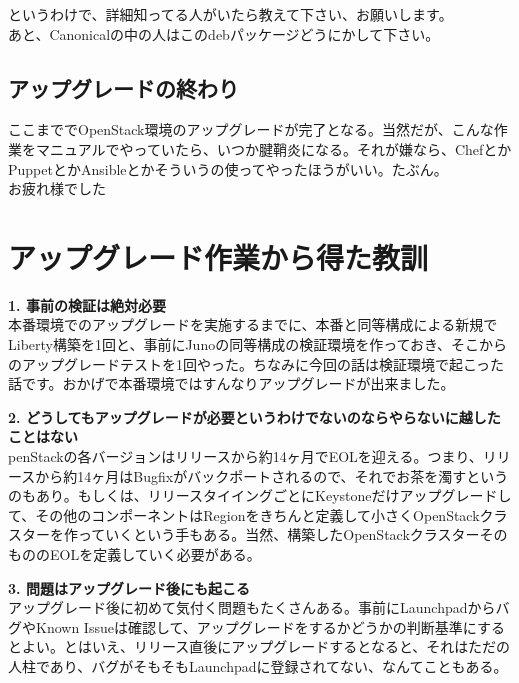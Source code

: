 \documentclass[9pt,b5paper,tombo,openany]{jsbook}
\begin{document}
\noindent
というわけで、詳細知ってる人がいたら教えて下さい、お願いします。\\[1ex]

\noindent
あと、Canonicalの中の人はこのdebパッケージどうにかして下さい。\\[1ex]

\subsection{アップグレードの終わり}
ここまででOpenStack環境のアップグレードが完了となる。当然だが、こんな作業をマニュアルでやっていたら、いつか腱鞘炎になる。それが嫌なら、ChefとかPuppetとかAnsibleとかそういうの使ってやったほうがいい。たぶん。\\[1ex]

\noindent
お疲れ様でした

\section{アップグレード作業から得た教訓}
\noindent
\textbf{1. 事前の検証は絶対必要}\\[1ex]

本番環境でのアップグレードを実施するまでに、本番と同等構成による新規でLiberty構築を1回と、事前にJunoの同等構成の検証環境を作っておき、そこからのアップグレードテストを1回やった。ちなみに今回の話は検証環境で起こった話です。おかげで本番環境ではすんなりアップグレードが出来ました。

\noindent
\textbf{2. どうしてもアップグレードが必要というわけでないのならやらないに越したことはない}\\[1ex]

penStackの各バージョンはリリースから約14ヶ月でEOLを迎える。つまり、リリースから約14ヶ月はBugfixがバックポートされるので、それでお茶を濁すというのもあり。もしくは、リリースタイイングごとにKeystoneだけアップグレードして、その他のコンポーネントはRegionをきちんと定義して小さくOpenStackクラスターを作っていくという手もある。当然、構築したOpenStackクラスターそのもののEOLを定義していく必要がある。

\noindent
\textbf{3. 問題はアップグレード後にも起こる}\\[1ex]

アップグレード後に初めて気付く問題もたくさんある。事前にLaunchpadからバグやKnown Issueは確認して、アップグレードをするかどうかの判断基準にするとよい。とはいえ、リリース直後にアップグレードするとなると、それはただの人柱であり、バグがそもそもLaunchpadに登録されてない、なんてこともある。
\end{document}
